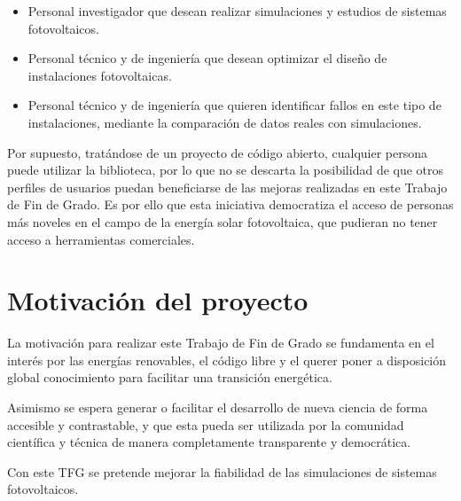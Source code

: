 \begin{itemize}

    \item Personal investigador que desean realizar simulaciones y estudios de sistemas fotovoltaicos.

    \item Personal técnico y de ingeniería que desean optimizar el diseño de instalaciones fotovoltaicas.

    \item Personal técnico y de ingeniería que quieren identificar fallos en este tipo de instalaciones, mediante la comparación de datos reales con simulaciones.

\end{itemize}

Por supuesto, tratándose de un proyecto de código abierto, cualquier persona puede utilizar la biblioteca, por lo que no se descarta la posibilidad de que otros perfiles de usuarios puedan beneficiarse de las mejoras realizadas en este Trabajo de Fin de Grado. Es por ello que esta iniciativa democratiza el acceso de personas más noveles en el campo de la energía solar fotovoltaica, que pudieran no tener acceso a herramientas comerciales.


\section{Motivación del proyecto} \label{sct:intro:motivacion}

La motivación para realizar este Trabajo de Fin de Grado se fundamenta en el interés por las energías renovables, el código libre y el querer poner a disposición global conocimiento para facilitar una transición energética.

Asimismo se espera generar o facilitar el desarrollo de nueva ciencia de forma accesible y contrastable, y que esta pueda ser utilizada por la comunidad científica y técnica de manera completamente transparente y democrática.

Con este TFG se pretende mejorar la fiabilidad de las simulaciones de sistemas fotovoltaicos.


